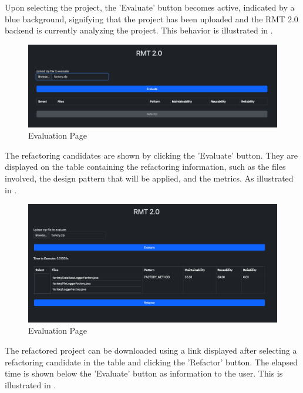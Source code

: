 Upon selecting the project, the 'Evaluate' button becomes active, indicated by a blue background, signifying that the project has been uploaded and the RMT 2.0 backend is currently analyzing the project. This behavior is illustrated in .

\begin{figure}[ht!]
\SetCaptionWidth{\textwidth}
\caption{Evaluation Page}
\label{fig-factory-selected}
\includegraphics[width =\textwidth]{Chapter-5/Figures/rmt-factory-client-selected.png}
\end{figure}
\FloatBarrier

The refactoring candidates are shown by clicking the 'Evaluate' button. They are displayed on the table containing the refactoring information, such as the files involved, the design pattern that will be applied, and the metrics. As illustrated in .

\begin{figure}[ht!]
\SetCaptionWidth{\textwidth}
\caption{Evaluation Page}
\label{fig-factory-evaluated}
\includegraphics[width =\textwidth]{Chapter-5/Figures/rmt-factory-evaluated.png}
\end{figure}
\FloatBarrier

The refactored project can be downloaded using a link displayed after selecting a refactoring candidate in the table and clicking the 'Refactor' button. The elapsed time is shown below the 'Evaluate' button as information to the user. This is illustrated in .

